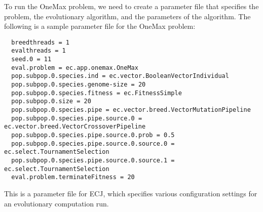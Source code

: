   To run the OneMax problem, we need to create a parameter file that specifies the problem, the evolutionary algorithm, and the parameters of the algorithm.
  The following is a sample parameter file for the OneMax problem:

  \begin{verbatim}
  breedthreads = 1
  evalthreads = 1
  seed.0 = 11
  eval.problem = ec.app.onemax.OneMax
  pop.subpop.0.species.ind = ec.vector.BooleanVectorIndividual
  pop.subpop.0.species.genome-size = 20
  pop.subpop.0.species.fitness = ec.FitnessSimple
  pop.subpop.0.size = 20
  pop.subpop.0.species.pipe = ec.vector.breed.VectorMutationPipeline
  pop.subpop.0.species.pipe.source.0 = ec.vector.breed.VectorCrossoverPipeline
  pop.subpop.0.species.pipe.source.0.prob = 0.5
  pop.subpop.0.species.pipe.source.0.source.0 = ec.select.TournamentSelection
  pop.subpop.0.species.pipe.source.0.source.1 = ec.select.TournamentSelection
  eval.problem.terminateFitness = 20
  \end{verbatim}

  This is a parameter file for ECJ, which specifies various configuration settings for an evolutionary computation run.
  

